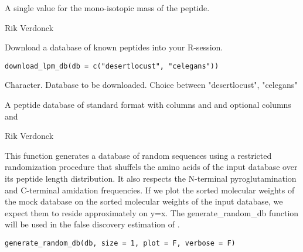 \documentclass[letterpaper]{book}
\begin{document}
%
\begin{Value}
A single value for the mono-isotopic mass of the peptide.
\end{Value}
%
\begin{Author}\relax
Rik Verdonck
\end{Author}
%
\begin{Description}\relax
Download a database of known peptides into your R-session.
\end{Description}
%
\begin{Usage}
\begin{verbatim}
download_lpm_db(db = c("desertlocust", "celegans"))
\end{verbatim}
\end{Usage}
%
\begin{Arguments}
\begin{ldescription}
\item[\code{db}] Character. Database to be downloaded. Choice between "desertlocust", "celegans"
\end{ldescription}
\end{Arguments}
%
\begin{Value}
A peptide database of standard format with columns  and  and optional columns  and 
\end{Value}
%
\begin{Author}\relax
Rik Verdonck
\end{Author}
%
\begin{Description}\relax
This function generates a database of random sequences using a restricted randomization procedure that shuffels the amino acids of the input database over its peptide length distribution. It also respects the N-terminal pyroglutamination and C-terminal amidation frequencies. If we plot the sorted molecular weights of the mock database on the sorted molecular weights of the input database, we expect them to reside approximately on y=x. The generate\_random\_db function will be used in the false discovery estimation of .
\end{Description}
%
\begin{Usage}
\begin{verbatim}
generate_random_db(db, size = 1, plot = F, verbose = F)
\end{verbatim}
\end{Usage}
\end{document}
